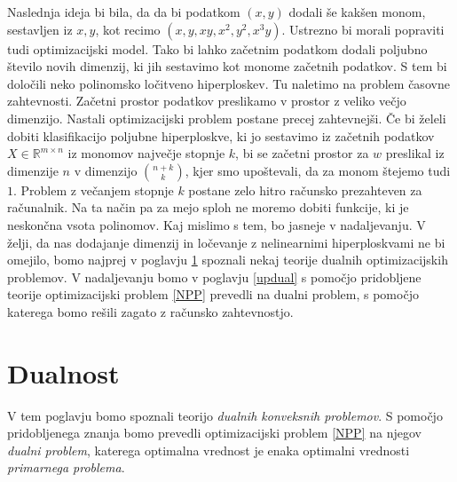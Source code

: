 \documentclass[mat1]{fmfdelo}
\newcommand{\R}{\mathbb R}
\begin{document}
Naslednja ideja bi bila, da da bi podatkom $(x, y)$ dodali še kakšen monom, sestavljen iz $x, y $, kot recimo $(x, y,xy, x^2, y^2, x^3y)$. Ustrezno bi morali popraviti tudi optimizacijski model. Tako bi lahko začetnim podatkom dodali poljubno število novih dimenzij, ki jih sestavimo kot monome začetnih podatkov. S tem bi določili neko polinomsko ločitveno hiperploskev. Tu naletimo na problem časovne zahtevnosti. Začetni prostor podatkov preslikamo v prostor z veliko večjo dimenzijo. Nastali optimizacijski problem postane precej zahtevnejši. Če bi želeli dobiti klasifikacijo poljubne hiperploskve, ki jo sestavimo iz začetnih podatkov $X \in \R^{m\times n}$ iz monomov največje stopnje $k$, bi se  začetni prostor za $w$ preslikal iz dimenzije $n$ v dimenzijo $\binom{n + k}{k}$, kjer smo upoštevali, da za monom štejemo tudi $1$. Problem z večanjem stopnje $k$ postane zelo hitro računsko prezahteven za računalnik. Na ta način pa za mejo sploh ne moremo dobiti funkcije, ki je neskončna vsota polinomov. Kaj mislimo s tem, bo jasneje v nadaljevanju. V želji, da nas dodajanje dimenzij in ločevanje z nelinearnimi hiperploskvami ne bi omejilo, bomo najprej v poglavju \ref{dual} spoznali nekaj teorije dualnih optimizacijskih problemov. V nadaljevanju bomo v poglavju \ref{updual} s pomočjo pridobljene teorije optimizacijski problem \eqref{NPP} prevedli na dualni problem, s pomočjo katerega bomo rešili zagato z računsko zahtevnostjo. 

\section{Dualnost}
\label{dual}

V tem poglavju bomo spoznali teorijo \emph{dualnih konveksnih problemov}. S pomočjo pridobljenega znanja bomo prevedli optimizacijski problem \eqref{NPP} na njegov \emph{dualni problem}, katerega optimalna vrednost je enaka optimalni vrednosti \emph{primarnega problema}. 
\end{document}
